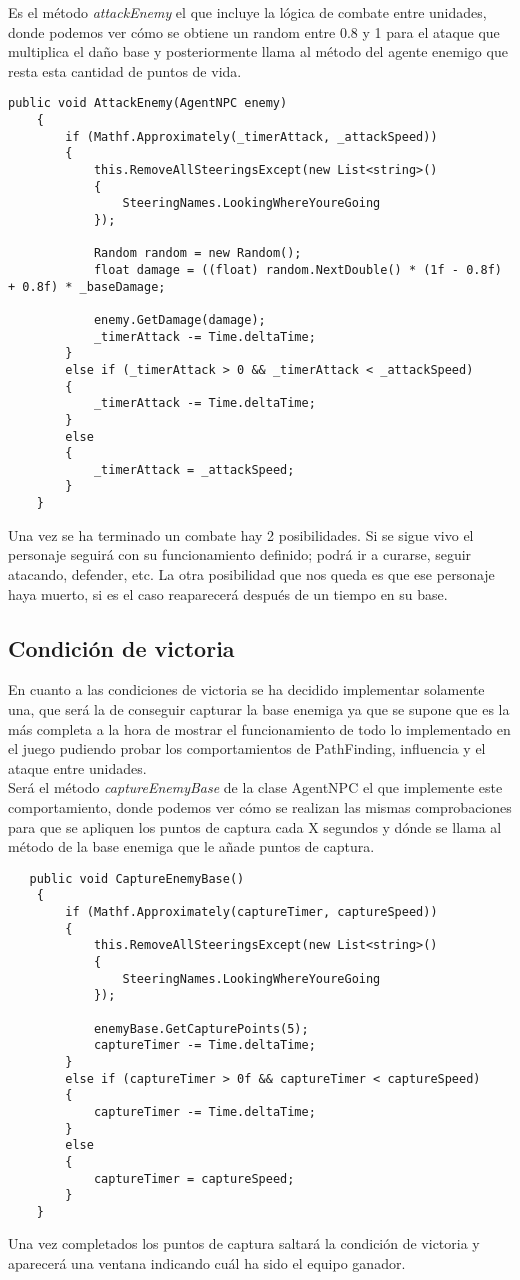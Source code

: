 Es el método \textit{attackEnemy} el que incluye la lógica de combate entre unidades, donde podemos ver cómo se obtiene un random entre 0.8 y 1 para el ataque que multiplica el daño base y posteriormente llama al método del agente enemigo que resta esta cantidad de puntos de vida.
\begin{lstlisting}
public void AttackEnemy(AgentNPC enemy)
    {
        if (Mathf.Approximately(_timerAttack, _attackSpeed))
        {
            this.RemoveAllSteeringsExcept(new List<string>()
            {
                SteeringNames.LookingWhereYoureGoing
            });
            
            Random random = new Random();
            float damage = ((float) random.NextDouble() * (1f - 0.8f) + 0.8f) * _baseDamage;
        
            enemy.GetDamage(damage);
            _timerAttack -= Time.deltaTime;
        }
        else if (_timerAttack > 0 && _timerAttack < _attackSpeed)
        {
            _timerAttack -= Time.deltaTime;
        }
        else
        {
            _timerAttack = _attackSpeed;
        }
    }
\end{lstlisting}
Una vez se ha terminado un combate hay 2 posibilidades. Si se sigue vivo el personaje seguirá con su funcionamiento definido; podrá ir a curarse, seguir atacando, defender, etc. La otra posibilidad que nos queda es que ese personaje haya muerto, si es el caso reaparecerá después de un tiempo en su base.
\subsection{Condición de victoria}
En cuanto a las condiciones de victoria se ha decidido implementar solamente una, que será la de conseguir capturar la base enemiga ya que  se supone que es la más completa a la hora de mostrar el funcionamiento de todo lo implementado en el juego pudiendo probar los comportamientos de PathFinding, influencia y el ataque entre unidades.\\

Será el método \textit{captureEnemyBase} de la clase AgentNPC el que implemente este comportamiento, donde podemos ver cómo se realizan las mismas comprobaciones para que se apliquen los puntos de captura cada X segundos y  dónde se llama al método de la base enemiga que le añade puntos de captura.
\begin{lstlisting}
   public void CaptureEnemyBase()
    {
        if (Mathf.Approximately(captureTimer, captureSpeed))
        {
            this.RemoveAllSteeringsExcept(new List<string>()
            {
                SteeringNames.LookingWhereYoureGoing
            });
            
            enemyBase.GetCapturePoints(5);
            captureTimer -= Time.deltaTime;
        }
        else if (captureTimer > 0f && captureTimer < captureSpeed)
        {
            captureTimer -= Time.deltaTime;
        }
        else
        {
            captureTimer = captureSpeed;
        }
    }
\end{lstlisting}
Una vez completados los puntos de captura saltará la condición de victoria y aparecerá una ventana indicando cuál ha sido el equipo ganador. 